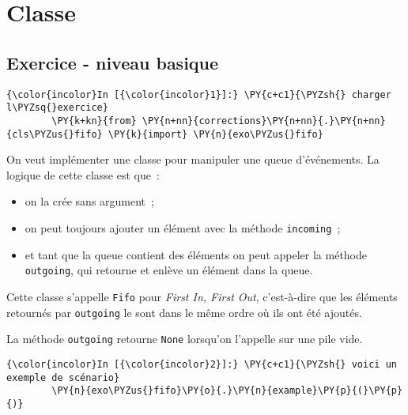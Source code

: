     
    
    
    

    

    \hypertarget{classe}{%
\section{Classe}\label{classe}}

    \hypertarget{exercice---niveau-basique}{%
\subsection{Exercice - niveau basique}\label{exercice---niveau-basique}}

    \begin{Verbatim}[commandchars=\\\{\},frame=single,framerule=0.3mm,rulecolor=\color{cellframecolor}]
{\color{incolor}In [{\color{incolor}1}]:} \PY{c+c1}{\PYZsh{} charger l\PYZsq{}exercice}
        \PY{k+kn}{from} \PY{n+nn}{corrections}\PY{n+nn}{.}\PY{n+nn}{cls\PYZus{}fifo} \PY{k}{import} \PY{n}{exo\PYZus{}fifo}
\end{Verbatim}


    On veut implémenter une classe pour manipuler une queue d'événements. La
logique de cette classe est que~:

\begin{itemize}
\tightlist
\item
  on la crée sans argument~;
\item
  on peut toujours ajouter un élément avec la méthode
  \texttt{incoming}~;
\item
  et tant que la queue contient des éléments on peut appeler la méthode
  \texttt{outgoing}, qui retourne et enlève un élément dans la queue.
\end{itemize}

Cette classe s'appelle \texttt{Fifo} pour \emph{First In, First Out},
c'est-à-dire que les éléments retournés par \texttt{outgoing} le sont
dans le même ordre où ils ont été ajoutés.

La méthode \texttt{outgoing} retourne \texttt{None} lorsqu'on l'appelle
sur une pile vide.

    \begin{Verbatim}[commandchars=\\\{\},frame=single,framerule=0.3mm,rulecolor=\color{cellframecolor}]
{\color{incolor}In [{\color{incolor}2}]:} \PY{c+c1}{\PYZsh{} voici un exemple de scénario}
        \PY{n}{exo\PYZus{}fifo}\PY{o}{.}\PY{n}{example}\PY{p}{(}\PY{p}{)}
\end{Verbatim}


